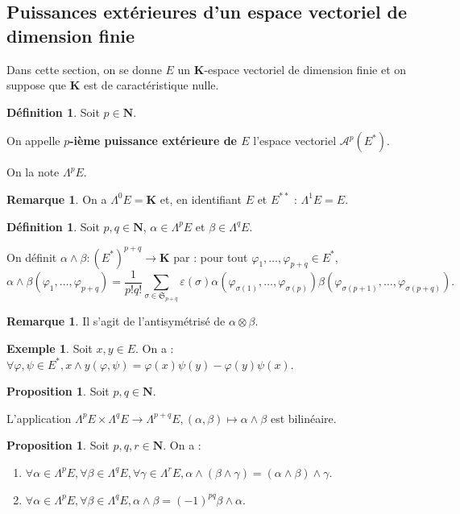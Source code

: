 \documentclass[12pt,a4paper]{article}
\theoremstyle{definition}
\newtheorem{prop}[thm]{Proposition}
\newtheorem{defn}[thm]{Définition}
\newtheorem{ex}[thm]{Exemple}
\newtheorem{rqe}[thm]{Remarque}
\begin{document}
\subsection{Puissances extérieures d'un espace vectoriel de dimension finie}
Dans cette section, on se donne $E$ un $\mathbf{K}$-espace vectoriel de dimension finie et on suppose que $\mathbf{K}$ est de caractéristique nulle.
\begin{defn}
Soit $p\in\mathbf{N}$.

On appelle \textbf{$p$-ième puissance extérieure de $E$} l'espace vectoriel $\mathcal{A}^p(E^*)$.

On la note $\Lambda^pE$.
\end{defn}
\begin{rqe}
On a $\Lambda^0E=\mathbf{K}$ et, en identifiant $E$ et $E^{**}$ : $\Lambda^1E=E$.
\end{rqe}
\begin{defn}
Soit $p,q\in\mathbf{N}$, $\alpha\in\Lambda^pE$ et $\beta\in\Lambda^qE$.

On définit $\alpha\wedge\beta:(E^*)^{p+q}\to\mathbf{K}$ par : pour tout $\varphi_1,\ldots,\varphi_{p+q}\in E^*$,
$$\alpha\wedge\beta(\varphi_1,\ldots,\varphi_{p+q})=\dfrac{1}{p!q!}\sum\limits_{\sigma\in\mathfrak{S}_{p+q}}\varepsilon(\sigma)\alpha\left(\varphi_{\sigma(1)},\ldots,\varphi_{\sigma(p)}\right)\beta\left(\varphi_{\sigma(p+1)},\ldots,\varphi_{\sigma(p+q)}\right).$$
\end{defn}
\begin{rqe}
Il s'agit de l'antisymétrisé de $\alpha\otimes\beta$.
\end{rqe}
\begin{ex}
Soit $x,y\in E$. On a : $\forall\varphi,\psi\in E^*, x\wedge y(\varphi,\psi)=\varphi(x)\psi(y)-\varphi(y)\psi(x)$.
\end{ex}
\begin{prop}
Soit $p,q\in\mathbf{N}$.

L'application $\Lambda^pE\times\Lambda^qE\to\Lambda^{p+q}E,(\alpha,\beta)\mapsto\alpha\wedge\beta$ est bilinéaire.
\end{prop}
\begin{prop}
Soit $p,q,r\in\mathbf{N}$. On a :
\begin{enumerate}[label=\roman*)]
\item $\forall \alpha\in\Lambda^pE, \forall \beta\in\Lambda^qE,\forall\gamma\in\Lambda^rE,\alpha\wedge(\beta\wedge\gamma)=(\alpha\wedge\beta)\wedge\gamma$.
\item $\forall \alpha\in\Lambda^pE,\forall \beta\in\Lambda^qE, \alpha\wedge\beta=(-1)^{pq}\beta\wedge\alpha$.
\end{enumerate}
\end{prop}
\end{document}
